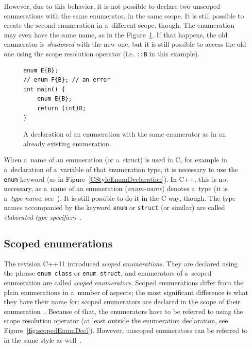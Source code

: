 \documentclass[nolot,nolof,nocover,printed]{fithesis3}
\newcommand{\stdN}[2]{\cite[#2]{#1}\xspace}
\begin{document}
However, due to this behavior, it is not possible to declare two unscoped enumerations with the same enumerator, in the same scope. It is still possible to create the second enumeration in a~different scope, though. The enumeration may even have the same name, as in the Figure~\ref{fig:collidingEnumerators}. If that happens, the old enumerator is \textit{shadowed} with the new one, but it is still possible to access the old one using the scope resolution operator (i.e. \lstinline|::B| in this example).
\begin{figure}
\begin{lstlisting}
enum E{B};
// enum F{B}; // an error
int main() { 
    enum E{B};
    return (int)B;
}  
\end{lstlisting}
\caption{A declaration of an enumeration with the same enumerator as in an already existing enumeration.}
\label{fig:collidingEnumerators}
\end{figure}


When a~name of an enumeration (or a~struct) is used in C, for example in a~declaration of a~variable of that enumeration type, it is necessary to use the \lstinline|enum| keyword (as in Figure~\ref{CStyleEnumDeclaration}). In C++, this is not necessary, as a~name of an enumeration (\textit{enum-name}) denotes a~type (it is a~\textit{type-name}, see~\stdN{n4296}{Annex A.1}). It is still possible to do it in the C way, though. The type names accompanied by the keyword \lstinline|enum| or \lstinline|struct| (or similar) are called \textit{elaborated type specifiers}~\stdN{n4296}{\S 3.4.4}.

\subsection{Scoped enumerations}

The revision C++11 introduced \textit{scoped enumerations}. They are declared using the phrase \lstinline|enum class| or \lstinline|enum struct|, and enumerators of a~scoped enumeration are called \textit{scoped enumerators}. Scoped enumerations differ from the plain enumerations in a~number of aspects; the most significant difference is what they have their name for: scoped enumerators are declared in the scope of their enumeration~\stdN{n4296}{\S 7.2/11}. Because of that, the enumerators have to be referred to using the scope resolution operator (at least outside the enumeration declaration, see Figure~\ref{fig:scopedEnumDecl}). However, unscoped enumerators can be referred to in the same style as well~\stdN{n4296}{\S 5.1.1/11}.
\end{document}
